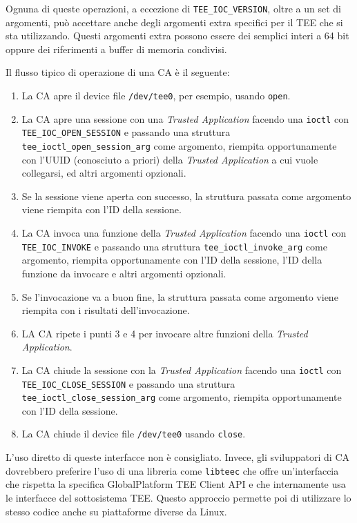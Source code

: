 \documentclass[12pt,italian]{report}
\begin{document}
Ognuna di queste operazioni, a eccezione di \texttt{TEE\_IOC\_VERSION},
oltre a un set di argomenti, può accettare anche degli argomenti extra
specifici per il TEE che si sta utilizzando.
Questi argomenti extra possono essere dei semplici interi a 64 bit oppure
dei riferimenti a buffer di memoria condivisi.

Il flusso tipico di operazione di una CA è il seguente:
\begin{enumerate}
    \item La CA apre il device file \texttt{/dev/tee0}, per esempio, usando
        \texttt{open}.
    \item La CA apre una sessione con una \textit{Trusted Application}
        facendo una \texttt{ioctl} con \texttt{TEE\_IOC\_OPEN\_SESSION}
        e passando una struttura \texttt{tee\_ioctl\_open\_session\_arg}
        come argomento, riempita opportunamente con l'UUID
        (conosciuto a priori) 
        della \textit{Trusted Application} a cui vuole collegarsi, 
        ed altri argomenti opzionali.
    \item Se la sessione viene aperta con successo, la struttura passata come
        argomento viene riempita con l'ID della sessione.
    \item La CA invoca una funzione della \textit{Trusted Application} facendo
        una \texttt{ioctl} con \texttt{TEE\_IOC\_INVOKE} e passando una
        struttura \texttt{tee\_ioctl\_invoke\_arg} come argomento, riempita
        opportunamente con l'ID della sessione, l'ID della funzione da
        invocare e altri argomenti opzionali.
    \item Se l'invocazione va a buon fine, la struttura passata come argomento
        viene riempita con i risultati dell'invocazione.
    \item LA CA ripete i punti 3 e 4 per invocare altre funzioni della
        \textit{Trusted Application}.
    \item La CA chiude la sessione con la \textit{Trusted Application} facendo
        una \texttt{ioctl} con \texttt{TEE\_IOC\_CLOSE\_SESSION} e passando
        una struttura \texttt{tee\_ioctl\_close\_session\_arg} come argomento,
        riempita opportunamente con l'ID della sessione.
    \item La CA chiude il device file \texttt{/dev/tee0} usando \texttt{close}.
\end{enumerate}

\bigbreak \noindent

L'uso diretto di queste interfacce non è consigliato.
Invece, gli sviluppatori di CA dovrebbero preferire l'uso di una libreria come
\texttt{libteec} che offre un'interfaccia che rispetta la specifica
GlobalPlatform TEE Client API\cite{gp2020internalapi} 
e che internamente usa
le interfacce del sottosistema TEE.
Questo approccio permette poi di utilizzare lo stesso codice anche su
piattaforme diverse da Linux.
\end{document}
